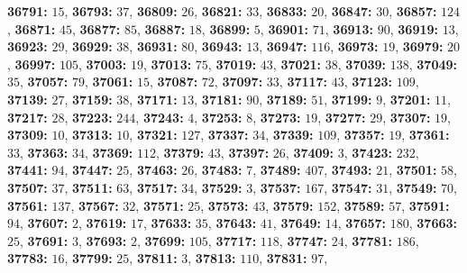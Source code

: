 \textsf{\bfseries 36791:} $15$, \textsf{\bfseries 36793:} $37$, \textsf{\bfseries 36809:} $26$, \textsf{\bfseries 36821:} $33$, \textsf{\bfseries 36833:} $20$, \textsf{\bfseries 36847:} $30$, \textsf{\bfseries 36857:} $124$, \textsf{\bfseries 36871:} $45$, \textsf{\bfseries 36877:} $85$, \textsf{\bfseries 36887:} $18$, \textsf{\bfseries 36899:} $5$, \textsf{\bfseries 36901:} $71$, \textsf{\bfseries 36913:} $90$, \textsf{\bfseries 36919:} $13$, \textsf{\bfseries 36923:} $29$, \textsf{\bfseries 36929:} $38$, \textsf{\bfseries 36931:} $80$, \textsf{\bfseries 36943:} $13$, \textsf{\bfseries 36947:} $116$, \textsf{\bfseries 36973:} $19$, \textsf{\bfseries 36979:} $20$, \textsf{\bfseries 36997:} $105$, \textsf{\bfseries 37003:} $19$, \textsf{\bfseries 37013:} $75$, \textsf{\bfseries 37019:} $43$, \textsf{\bfseries 37021:} $38$, \textsf{\bfseries 37039:} $138$, \textsf{\bfseries 37049:} $35$, \textsf{\bfseries 37057:} $79$, \textsf{\bfseries 37061:} $15$, \textsf{\bfseries 37087:} $72$, \textsf{\bfseries 37097:} $33$, \textsf{\bfseries 37117:} $43$, \textsf{\bfseries 37123:} $109$, \textsf{\bfseries 37139:} $27$, \textsf{\bfseries 37159:} $38$, \textsf{\bfseries 37171:} $13$, \textsf{\bfseries 37181:} $90$, \textsf{\bfseries 37189:} $51$, \textsf{\bfseries 37199:} $9$, \textsf{\bfseries 37201:} $11$, \textsf{\bfseries 37217:} $28$, \textsf{\bfseries 37223:} $244$, \textsf{\bfseries 37243:} $4$, \textsf{\bfseries 37253:} $8$, \textsf{\bfseries 37273:} $19$, \textsf{\bfseries 37277:} $29$, \textsf{\bfseries 37307:} $19$, \textsf{\bfseries 37309:} $10$, \textsf{\bfseries 37313:} $10$, \textsf{\bfseries 37321:} $127$, \textsf{\bfseries 37337:} $34$, \textsf{\bfseries 37339:} $109$, \textsf{\bfseries 37357:} $19$, \textsf{\bfseries 37361:} $33$, \textsf{\bfseries 37363:} $34$, \textsf{\bfseries 37369:} $112$, \textsf{\bfseries 37379:} $43$, \textsf{\bfseries 37397:} $26$, \textsf{\bfseries 37409:} $3$, \textsf{\bfseries 37423:} $232$, \textsf{\bfseries 37441:} $94$, \textsf{\bfseries 37447:} $25$, \textsf{\bfseries 37463:} $26$, \textsf{\bfseries 37483:} $7$, \textsf{\bfseries 37489:} $407$, \textsf{\bfseries 37493:} $21$, \textsf{\bfseries 37501:} $58$, \textsf{\bfseries 37507:} $37$, \textsf{\bfseries 37511:} $63$, \textsf{\bfseries 37517:} $34$, \textsf{\bfseries 37529:} $3$, \textsf{\bfseries 37537:} $167$, \textsf{\bfseries 37547:} $31$, \textsf{\bfseries 37549:} $70$, \textsf{\bfseries 37561:} $137$, \textsf{\bfseries 37567:} $32$, \textsf{\bfseries 37571:} $25$, \textsf{\bfseries 37573:} $43$, \textsf{\bfseries 37579:} $152$, \textsf{\bfseries 37589:} $57$, \textsf{\bfseries 37591:} $94$, \textsf{\bfseries 37607:} $2$, \textsf{\bfseries 37619:} $17$, \textsf{\bfseries 37633:} $35$, \textsf{\bfseries 37643:} $41$, \textsf{\bfseries 37649:} $14$, \textsf{\bfseries 37657:} $180$, \textsf{\bfseries 37663:} $25$, \textsf{\bfseries 37691:} $3$, \textsf{\bfseries 37693:} $2$, \textsf{\bfseries 37699:} $105$, \textsf{\bfseries 37717:} $118$, \textsf{\bfseries 37747:} $24$, \textsf{\bfseries 37781:} $186$, \textsf{\bfseries 37783:} $16$, \textsf{\bfseries 37799:} $25$, \textsf{\bfseries 37811:} $3$, \textsf{\bfseries 37813:} $110$, \textsf{\bfseries 37831:} $97$, 
